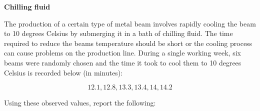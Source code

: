 \documentclass[addpoints]{examsetup}\usepackage[]{graphicx}\usepackage[]{color}
\begin{document}
\begin{questions}

\question 
\textbf{Chilling fluid}

The production of a certain type of metal beam involves rapidly cooling the beam to 10 degrees Celsius by submerging it in a bath of chilling fluid.
The time required to reduce the beams temperature should be short or the cooling process can cause problems on the production line.
During a single working week, six beams were randomly chosen and the time it took to cool them to 10 degrees Celsius is recorded below (in minutes):


$$
   12.1, 12.8, 13.3, 13.4, 14, 14.2
$$

Using these observed values, report the following:

\end{questions}
\end{document}

